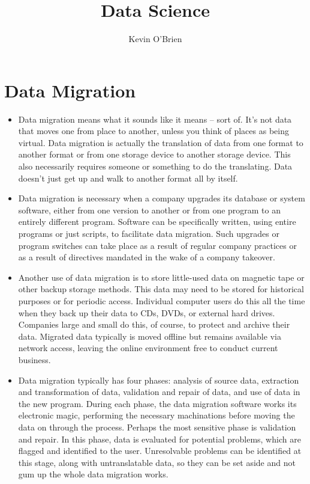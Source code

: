 \documentclass[12pt]{article}
\title{Data Science}
\author{Kevin O'Brien}
\begin{document}
	
	\section*{Data Migration}

\begin{itemize}
\item Data migration means what it sounds like it means -- sort of. It's not data that moves one from place to another, unless you think of places as being virtual. Data migration is actually the translation of data from one format to another format or from one storage device to another storage device. This also necessarily requires someone or something to do the translating. Data doesn't just get up and walk to another format all by itself.



\item Data migration is necessary when a company upgrades its database or system software, either from one version to another or from one program to an entirely different program. Software can be specifically written, using entire programs or just scripts, to facilitate data migration. Such upgrades or program switches can take place as a result of regular company practices or as a result of directives mandated in the wake of a company takeover.



\item Another use of data migration is to store little-used data on magnetic tape or other backup storage methods. This data may need to be stored for historical purposes or for periodic access. Individual computer users do this all the time when they back up their data to CDs, DVDs, or external hard drives. Companies large and small do this, of course, to protect and archive their data. Migrated data typically is moved offline but remains available via network access, leaving the online environment free to conduct current business.



\item Data migration typically has four phases: analysis of source data, extraction and transformation of data, validation and repair of data, and use of data in the new program. During each phase, the data migration software works its electronic magic, performing the necessary machinations before moving the data on through the process. Perhaps the most sensitive phase is validation and repair. In this phase, data is evaluated for potential problems, which are flagged and identified to the user. Unresolvable problems can be identified at this stage, along with untranslatable data, so they can be set aside and not gum up the whole data migration works.
\end{itemize}
\end{document}
